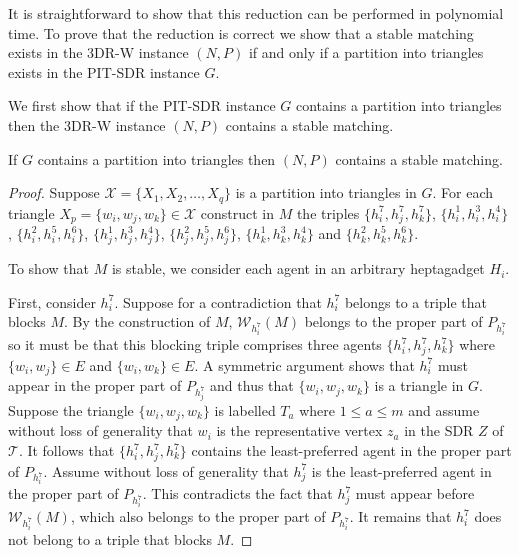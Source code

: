 It is straightforward to show that this reduction can be performed in polynomial time. To prove that the reduction is correct we show that a stable matching exists in the 3DR-W instance $(N, P)$ if and only if a partition into triangles exists in the PIT-SDR instance $G$.

We first show that if the PIT-SDR instance $G$ contains a partition into triangles then the 3DR-W instance $(N, P)$ contains a stable matching.

\begin{lem}
\label{lem:threed_sr_w_stablematchingifpartitionexists}
If $G$ contains a partition into triangles then $(N, P)$ contains a stable matching.
\end{lem}
\begin{proof}
Suppose $\mathcal{X} = \{ X_1, X_2, \dots, X_q \}$ is a partition into triangles in $G$. For each triangle $X_p = \{ w_i, w_j, w_k \} \in \mathcal{X}$ construct in $M$ the triples $\{h_i^7,h_j^7,h_k^7\}$, $\{h_i^1,h_i^3,h_i^4\}$, $\{h_i^2,h_i^5,h_i^6\}$, $\{h_j^1,h_j^3,h_j^4\}$, $\{h_j^2,h_j^5,h_j^6\}$, $\{h_k^1,h_k^3,h_k^4\}$ and $\{h_k^2,h_k^5,h_k^6\}$.

To show that $M$ is stable, we consider each agent in an arbitrary heptagadget $H_i$. 

First, consider $h_i^7$. Suppose for a contradiction that $h_i^7$ belongs to a triple that blocks $M$. By the construction of $M$, $\mathscr{W}_{h_i^7}(M)$ belongs to the proper part of $P_{h_i^7}$ so it must be that this blocking triple comprises three agents $\{ h_i^7, h_j^7, h_k^7 \}$ where $\{ w_i, w_j \} \in E$ and $\{ w_i, w_k \} \in E$. A symmetric argument shows that $h_i^7$ must appear in the proper part of $P_{h_j^7}$ and thus that $\{ w_i, w_j, w_k \}$ is a triangle in $G$. Suppose the triangle $\{ w_i, w_j, w_k \}$ is labelled $T_a$ where $1\leq a \leq m$ and assume without loss of generality that $w_i$ is the representative vertex $z_a$ in the SDR $Z$ of $\mathcal{T}$. It follows that $\{ h_i^7, h_j^7, h_k^7 \}$ contains the least-preferred agent in the proper part of $P_{h_i^7}$. Assume without loss of generality that $h_j^7$ is the least-preferred agent in the proper part of $P_{h_i^7}$. This contradicts the fact that $h_j^7$ must appear before $\mathscr{W}_{h_i^7}(M)$, which also belongs to the proper part of $P_{h_i^7}$. It remains that $h_i^7$ does not belong to a triple that blocks $M$.


\end{proof}
